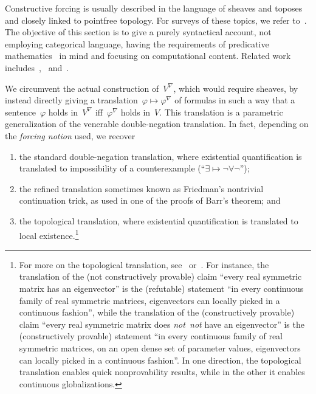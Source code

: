 \documentclass[envcountsect,envcountsame,runningheads]{llncs}
\renewcommand{\_}{\mathpunct{.}\,}
\begin{document}
Constructive forcing is usually described in the language of sheaves and
toposes~\cite{palmgren:css,grayson:forcing,streicher:forcing,yamamoto:forcing}
and closely linked to pointfree topology. For surveys of these topics, we
refer to~\cite{blechschmidt:generalized-spaces,johnstone:art,johnstone:point,vickers:continuity,vickers:locales-toposes,belanger-marquis:pointless,johnstone:baby-elephant}.
The objective of this section is to give a purely syntactical account, not
employing categorical language, having the requirements of predicative
mathematics~\cite{maietti:au,vickers:sketches,crosilla:predicativity} in mind
and focusing
on computational content. Related work
includes~\cite[Section~2.4]{avigad:forcing},~\cite{coquand:goodman} and~\cite[Section~2.3]{renardel-de-lavalette:bi}.

We circumvent the actual construction of~$V^\nabla$, which would require sheaves, by
instead directly giving a translation~$\varphi \mapsto \varphi^\nabla$ of
formulas in such a way that a sentence~$\varphi$ holds in~$V^\nabla$
iff~$\varphi^\nabla$ holds in~$V$. This translation is a parametric
generalization of the venerable double-negation translation. In fact, depending
on the \emph{forcing notion} used, we recover
\begin{enumerate}
\item[(1)] the standard double-negation translation, where
existential quantification is translated to impossibility of a counterexample
(``$\exists \mapsto \neg\forall\neg$'');
\item[(2)] the refined translation sometimes known as Friedman's nontrivial
continuation trick, as used in one of the proofs of Barr's theorem; and
\item[(3)] the topological translation, where existential quantification is
translated to local existence.\footnote{For more on the topological
translation, see~\cite[Section~4.3]{blechschmidt:filmat}
or~\cite[Section~2.4]{blechschmidt:generalized-spaces}. For instance, the
translation of the (not constructively provable) claim ``every real symmetric
matrix has an eigenvector'' is the (refutable) statement ``in every continuous
family of real symmetric matrices, eigenvectors can locally picked in a
continuous fashion'', while the translation of the (constructively provable)
claim ``every real symmetric matrix does \emph{not~not} have an eigenvector''
is the (constructively provable) statement ``in every continuous family of real
symmetric matrices, on an open dense set of parameter values, eigenvectors can
locally picked in a continuous fashion''. In one direction, the topological
translation enables quick nonprovability results, while in the other it enables
continuous globalizations.}
\end{enumerate}
\end{document}

